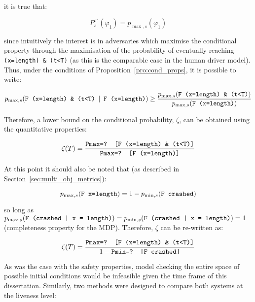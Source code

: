 it is true that:

\begin{equation}
	P^{\sigma'}_s (\varphi_1) = p_{\max, s} (\varphi_1)
\end{equation}

since intuitively the interest is in adversaries which maximise the conditional property through the maximisation of the probability of eventually reaching \texttt{(x=length) \& (t<T)} (as this is the comparable case in the human driver model). Thus, under the conditions of Proposition~\ref{pro:cond_props}, it is possible to write:

\begin{equation}
	p_{\max, s} (\text{\texttt{F (x=length) \& (t<T)}} \:\mid\: \text{\texttt{F (x=length)}}) \geq \frac{p_{\max, s} (\text{\texttt{F (x=length) \& (t<T)}})}{p_{\max, s} (\text{\texttt{F (x=length)}})}
\end{equation}

Therefore, a lower bound on the conditional probability, $\zeta$, can be obtained using the quantitative properties:

\begin{equation}
	\zeta(T) = \frac{\text{\texttt{Pmax=? [F (x=length) \& (t<T)]}}}{\text{\texttt{Pmax=? [F (x=length)]}}}
\end{equation}

At this point it should also be noted that (as described in Section~\ref{sec:multi_obj_metrics}):

\begin{equation}
	p_{\max,s} (\text{\texttt{F x=length}}) = 1 - p_{\min,s} (\text{\texttt{F crashed}})
\end{equation}

so long as $p_{\max, s} (\text{\texttt{F (crashed | x = length)}}) = p_{\min, s} (\text{\texttt{F (crashed | x = length)}}) = 1$ (completeness property for the MDP). Therefore, $\zeta$ can be re-written as:

\begin{equation}
	\zeta(T) = \frac{\text{\texttt{Pmax=? [F (x=length) \& (t<T)]}}}{1 - \text{\texttt{Pmin=? [F crashed]}}}
\end{equation}

As was the case with the safety properties, model checking the entire space of possible initial conditions would be infeasible given the time frame of this dissertation. Similarly, two methods were designed to compare both systems at the liveness level:

